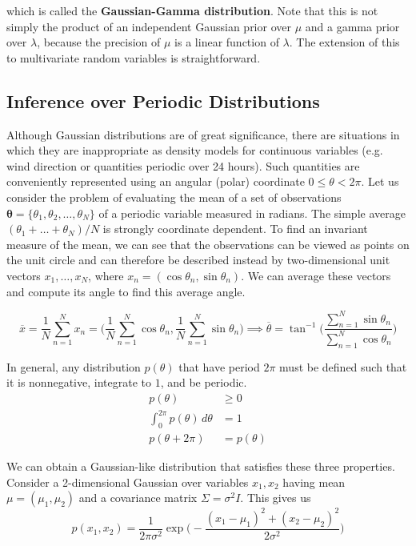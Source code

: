   which is called the \textbf{Gaussian-Gamma distribution}. Note that this is not simply the product of an independent Gaussian prior over $\mu$ and a gamma prior over $\lambda$, because the precision of $\mu$ is a linear function of $\lambda$. The extension of this to multivariate random variables is straightforward.

\subsection{Inference over Periodic Distributions}

  Although Gaussian distributions are of great significance, there are situations in which they are inappropriate as density models for continuous variables (e.g. wind direction or quantities periodic over 24 hours). Such quantities are conveniently represented using an angular (polar) coordinate $0 \leq \theta < 2\pi$. Let us consider the problem of evaluating the mean of a set of observations $\mathbf{\theta} = \{\theta_1, \theta_2, \ldots, \theta_N\}$ of a periodic variable measured in radians. The simple average $(\theta_1 + \ldots + \theta_N)/N$ is strongly coordinate dependent. To find an invariant measure of the mean, we can see that the observations can be viewed as points on the unit circle and can therefore be described instead by two-dimensional unit vectors $x_1, \ldots, x_N$, where $x_n = (\cos{\theta_n}, \sin{\theta_n})$. We can average these vectors and compute its angle to find this average angle.

  \begin{equation}
    \overline{x} = \frac{1}{N} \sum_{n=1}^N x_n = \Big( \frac{1}{N} \sum_{n=1}^N \cos{\theta_n} , \frac{1}{N} \sum_{n=1}^N \sin{\theta_n} \Big) \implies \overline{\theta} = \tan^{-1} \bigg( \frac{\sum_{n=1}^N \sin{\theta_n}}{\sum_{n=1}^N \cos{\theta_n}} \bigg)
  \end{equation}

  In general, any distribution $p(\theta)$ that have period $2\pi$ must be defined such that it is nonnegative, integrate to $1$, and be periodic.
  \begin{align*} 
    p(\theta) & \geq 0 \\
    \int_0^{2\pi} p(\theta)\,d\theta  & = 1 \\
    p(\theta + 2\pi) & = p(\theta)
  \end{align*}

  We can obtain a Gaussian-like distribution that satisfies these three properties. Consider a 2-dimensional Gaussian over variables $x_1, x_2$ having mean $\mu = (\mu_1, \mu_2)$ and a covariance matrix $\Sigma = \sigma^2 I$. This gives us
  \begin{equation}
    p(x_1, x_2) = \frac{1}{2\pi \sigma^2} \exp \bigg( -\frac{(x_1 - \mu_1)^2 + (x_2 - \mu_2)^2}{2\sigma^2} \bigg)
  \end{equation}

